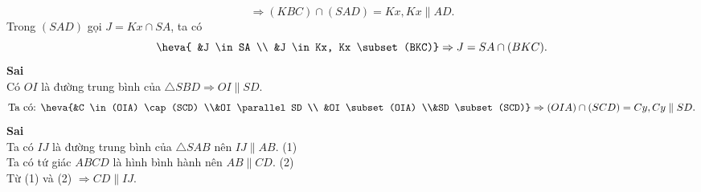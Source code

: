 \begin{ex}
{\begin{itemchoice}
\[			 \Rightarrow
			(KBC) \cap (SAD)=Kx, Kx  \parallel AD.
			 \]
			Trong $(SAD)$ gọi $J = Kx  \cap SA$, ta có
			 \[
			\heva{ 
			&J \in SA \\ 
			 &J \in Kx, Kx \subset (BKC)}
			\Rightarrow J =  SA \cap (BKC).
			\] 
			\itemch  \textbf{Sai}\\
			Có  $OI$ là đường trung bình của $\triangle SBD \Rightarrow OI \parallel SD$.
			 \[
			\text{Ta có: } 
			\heva{&C \in  (OIA) \cap (SCD) \\&OI \parallel SD \\ &OI \subset (OIA) \\&SD \subset (SCD)}
			\Rightarrow 
			 (OIA) \cap (SCD)=Cy, Cy \parallel SD.
			 \]
			\itemch  \textbf{Sai} \\
			 Ta có $IJ$ là đường trung bình của $\triangle SAB$ nên $IJ \parallel AB$. \hfill (1)\\
			Ta có tứ giác $ABCD$  là hình bình hành nên $AB \parallel CD$. \hfill (2)\\
			Từ (1) và (2) $\Rightarrow  CD \parallel IJ$.
		\end{itemchoice}
	 }
\end{ex}

